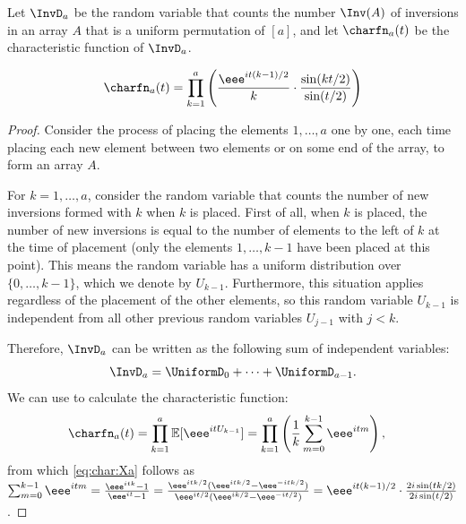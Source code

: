 \documentclass{toc}
\begin{document}
Let $\InvD_a$ be the random variable that counts the number $\Inv(A)$ of inversions in an array $A$ that is a uniform permutation of $[a]$, and let $\charfn_a(t)$ be the characteristic function of $\InvD_a$.
\begin{claim}
    \label{claim:inversion-charfn}
    \begin{align}\label{eq:char:Xa}
    \charfn_a(t)=\prod_{k=1}^{a}\left(\frac{\eee^{it(k-1)/2}}{k}\cdot\frac{\sin(kt/2)}{\sin(t/2)}\right) 
    \end{align}
\end{claim}
\begin{proof}
Consider the process of placing the elements $1,\dots,a$ one by one, each time placing each new element between two elements or on some end of the array, to form an array $A$. 

For $k=1,\dots,a$, consider the random variable that counts the number of new inversions formed with $k$ when $k$ is placed. First of all, when $k$ is placed, the number of new inversions is equal to the number of elements to the left of $k$ at the time of placement (only the elements $1,\dots,k-1$ have been placed at this point). This means the random variable has a uniform distribution over $\{0,\dots,k-1\}$, which we denote by $U_{k-1}$. Furthermore, this situation applies regardless of the placement of the other elements, so this random variable $U_{k-1}$ is independent from all other previous random variables $U_{j-1}$ with $j<k$. 

Therefore, $\InvD_a$ can be written as the following sum of independent variables:
\[\InvD_a = \UniformD_0 + \dots + \UniformD_{a-1}. \]
We can use  to calculate the characteristic function:
\begin{align*}
\charfn_a(t)&=\prod_{k=1}^{a} \mathbb{E}[\eee^{itU_{k-1}}]=\prod_{k=1}^{a}\left(\frac{1}{k}\sum_{m=0}^{k-1} \eee^{itm}\right),
\end{align*}
from which \eqref{eq:char:Xa} follows as
$\sum_{m=0}^{k-1} \eee^{itm} 
= \frac{\eee^{itk}-1}{\eee^{it}-1} 
= \frac{\eee^{itk/2}(\eee^{itk/2}-\eee^{-itk/2})}{\eee^{it/2}(\eee^{ik/2}-\eee^{-it/2})} 
= \eee^{it(k-1)/2} \cdot \frac{2i\sin(tk/2)}{2i\sin(t/2)}$.
\end{proof}
\end{document}

